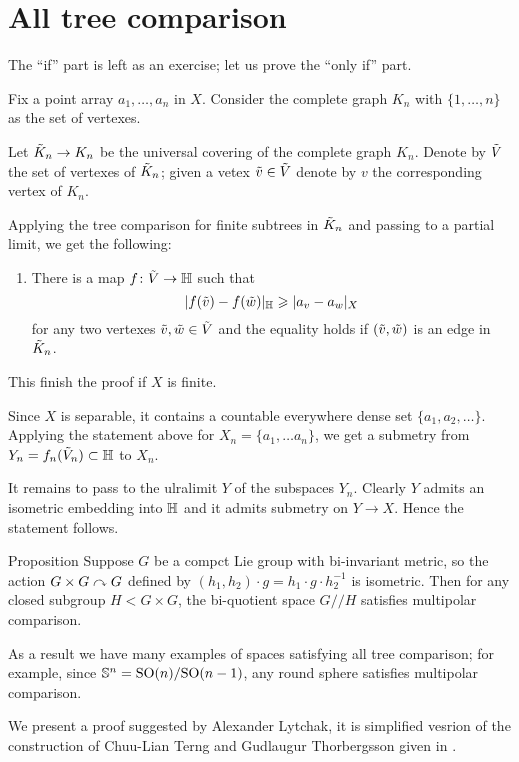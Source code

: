 \section{All tree comparison}\label{sec:all-tree}


The ``if'' part is left as an exercise;
let us prove the ``only if'' part.

Fix a point array $a_1,\dots, a_n$ in $X$.
Consider the complete graph $K_n$ with $\{1,\dots,n\}$ as the set of vertexes.


Let $\~ K_n\to K_n$ be the universal covering of the complete graph $K_n$.
Denote by $\~ V$ the set of vertexes of $\~ K_n$;
given a vetex $\~ v\in\~V$ denote by $v$ the corresponding vertex of $K_n$.

Applying the tree comparison for finite subtrees in $\~ K_n$ and passing to a partial limit,  we get the following:

\begin{enumerate}[$({*})$]
\item There is a map $f\:\~V\to\HH$ such that 
\[|f(\~v)-f(\~w)|_\HH\ge |a_v-a_w|_X\]
for any two vertexes $\~v,\~w\in \~ V$ and the equality holds if $(\~v,\~w)$ is an edge in $\~ K_n$.
\end{enumerate}

This finish the proof if $X$ is finite.

Since $X$ is separable, it contains a countable everywhere dense set $\{a_1,a_2,\dots\}$. 
Applying the statement above for $X_n=\{a_1,\dots a_n\}$, we get 
a submetry from $Y_n=f_n(\~V_n)\subset \HH$ to $X_n$.

It remains to pass to the ulralimit $Y$ of the subspaces $Y_n$.
Clearly $Y$ admits an isometric embedding into $\HH$ 
and it admits submetry on $Y\to X$.
Hence the statement follows.
\qeds

\begin{thm}{Proposition}
Suppose $G$ be a compct Lie group with bi-invariant metric, so the action $G\times G\acts G$ defined by $(h_1,h_2)\cdot g=h_1\cdot g\cdot  h_2^{-1}$ is isometric. 
Then for any closed subgroup $H<G\times G$, the bi-quotient space $G/\!\!/H$ satisfies multipolar comparison.
\end{thm}

As a result we have many examples of spaces satisfying all tree comparison;
for example, since $\SS^n=\SO(n)/\SO(n-1)$, any round sphere satisfies multipolar comparison.

We present a proof suggested by Alexander Lytchak, it is simplified vesrion of the construction of Chuu-Lian Terng and Gudlaugur Thorbergsson given in \cite[Section 4]{terng-thorbergsson}.


